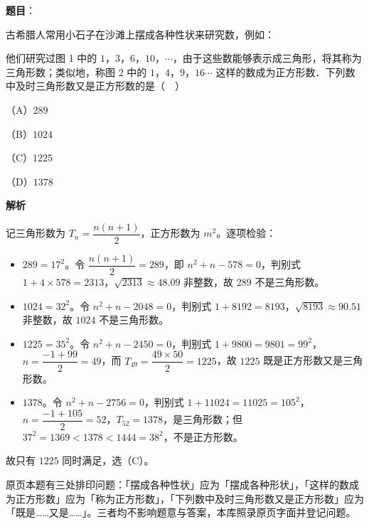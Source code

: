 \begin{answer}

\textbf{题目}：

古希腊人常用小石子在沙滩上摆成各种性状来研究数，例如：
\nopagebreak[4]
\begin{center}\end{center}
\nopagebreak[4]
他们研究过图 1 中的 $1$，$3$，$6$，$10$，$\cdots$，由于这些数能够表示成三角形，将其称为三角形数；类似地，称图 2 中的 $1$，$4$，$9$，$16\cdots$ 这样的数成为正方形数．下列数中及时三角形数又是正方形数的是（　）

（A）$289$

（B）$1024$

（C）$1225$

（D）$1378$

\textbf{解析}

记三角形数为 $T_n=\dfrac{n(n+1)}2$，正方形数为 $m^2$。逐项检验：

\begin{itemize}
\item $289=17^2$。令 $\dfrac{n(n+1)}2=289$，即 $n^2+n-578=0$，判别式 $1+4\times578=2313$，$\sqrt{2313}\approx48.09$ 非整数，故 $289$ 不是三角形数。
\item $1024=32^2$。令 $n^2+n-2048=0$，判别式 $1+8192=8193$，$\sqrt{8193}\approx90.51$ 非整数，故 $1024$ 不是三角形数。
\item $1225=35^2$。令 $n^2+n-2450=0$，判别式 $1+9800=9801=99^2$，$n=\dfrac{-1+99}{2}=49$，而 $T_{49}=\dfrac{49\times50}{2}=1225$，故 $1225$ 既是正方形数又是三角形数。
\item $1378$。令 $n^2+n-2756=0$，判别式 $1+11024=11025=105^2$，$n=\dfrac{-1+105}{2}=52$，$T_{52}=1378$，是三角形数；但 $37^2=1369<1378<1444=38^2$，不是正方形数。
\end{itemize}

故只有 $1225$ 同时满足，选（C）。

原页本题有三处排印问题：「摆成各种性状」应为「摆成各种形状」，「这样的数成为正方形数」应为「称为正方形数」，「下列数中及时三角形数又是正方形数」应为「既是……又是……」。三者均不影响题意与答案，本库照录原页字面并登记问题。


\end{answer}
